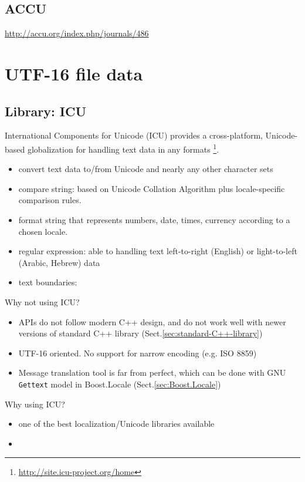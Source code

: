 \subsection{ACCU}

\url{http://accu.org/index.php/journals/486}


\section{UTF-16 file data}


\subsection{Library: ICU}
\label{sec:ICU}


International Components for Unicode (ICU) provides a cross-platform,
Unicode-based globalization for handling text data in any formats
\footnote{\url{http://site.icu-project.org/home}}.

\begin{itemize}
  \item convert text data to/from Unicode and nearly any other character sets
  \item compare string: based on Unicode Collation Algorithm plus
  locale-specific comparison rules.
  
  \item format string that represents numbers, date, times, currency according
  to a chosen locale.
  \item regular expression: able to handling text left-to-right (English) or
  light-to-left (Arabic, Hebrew) data
  \item text boundaries: 
\end{itemize}

\begin{mdframed}
Why not using ICU?
\begin{itemize}
  \item APIs do not follow modern C++ design, and do not work well with
  newer versions of standard C++ library
  (Sect.\ref{sec:standard-C++-library})
  
  \item UTF-16 oriented. No support for narrow encoding (e.g. ISO 8859)
  
  \item Message translation tool is far from perfect, which can be done with
  GNU \verb!Gettext! model in Boost.Locale (Sect.\ref{sec:Boost.Locale})
  
\end{itemize}

Why using ICU?
\begin{itemize}
  \item one of the best localization/Unicode libraries available
  \item 
\end{itemize}
\end{mdframed}


